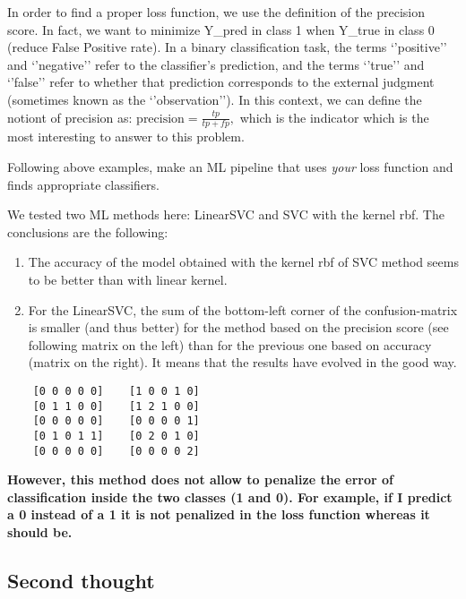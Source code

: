 \documentclass[10pt,a4paper]{article}
\theoremstyle{break}
\begin{document}
In order to find a proper loss function, we use the definition of the precision score.
In fact, we want to minimize Y\_pred in class 1 when Y\_true in class 0 (reduce False Positive rate).
In a binary classification task, the terms `'positive'' and `'negative'' refer to the classifier's prediction, and the terms `'true'' and `'false'' refer to whether that prediction corresponds to the external judgment (sometimes known as the `'observation''). In this context, we can define the notiont of precision as: \(\text{precision} = \frac{tp}{tp + fp},\) which is the indicator which is the most interesting to answer to this problem.

\begin{tcolorbox}

Following above examples, make an ML pipeline that uses \emph{your} loss function and finds appropriate classifiers.

\end{tcolorbox}

We tested two ML methods here: LinearSVC and SVC with the kernel rbf. The conclusions are the following:

\begin{enumerate}
\def\labelenumi{\arabic{enumi}.}
\item
  The accuracy of the model obtained with the kernel rbf of SVC method seems to be better than with linear kernel.
\item
  For the LinearSVC, the sum of the bottom-left corner of the confusion-matrix is smaller (and thus better) for the method based on the precision score (see following matrix on the left) than for the previous one based on accuracy (matrix on the right). It means that the results have evolved in the good way.
\end{enumerate}

\footnotesize

\begin{verbatim}
    [0 0 0 0 0]    [1 0 0 1 0]  
    [0 1 1 0 0]    [1 2 1 0 0]  
    [0 0 0 0 0]    [0 0 0 0 1]  
    [0 1 0 1 1]    [0 2 0 1 0]  
    [0 0 0 0 0]    [0 0 0 0 2]  
\end{verbatim}

\normalsize

\textbf{\faArrowCircleRight{} However, this method does not allow to penalize the error of classification inside the two classes (1 and 0). For example, if I predict a 0 instead of a 1 it is not penalized in the loss function whereas it should be.}

\hypertarget{second-thought}{%
\subsection{Second thought}\label{second-thought}}
\end{document}
